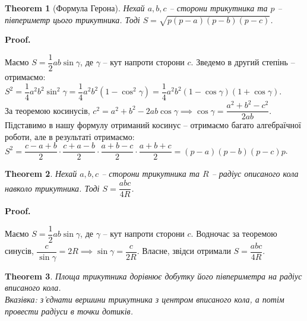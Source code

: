 \documentclass[a4paper, 10pt]{article}
\makeatletter
\theoremstyle{theoremdd}
\newtheorem{theorem}{Theorem}[subsection]
\theoremstyle{theoremdd}
\theoremstyle{theoremdd}
\theoremstyle{theoremdd}
\theoremstyle{theoremdd}
\theoremstyle{theoremdd}
\theoremstyle{theoremdd}
\theoremstyle{theoremdd}
\theoremstyle{theoremdd}
\renewenvironment{proof}[1][Proof.\\]{\par
\pushQED{\hfill \qed}%
\normalfont \topsep6\p@\@plus6\p@\relax
\trivlist
\item\relax
{\bfseries
#1\@addpunct{.}}\hspace\labelsep\ignorespaces
}{%
\popQED\endtrivlist\@endpefalse
}
\makeatother
\begin{document}
\begin{theorem}[Формула Герона]
Нехай $a,b,c$ -- сторони трикутника та $p$ -- півпериметр цього трикутника. Тоді $S = \sqrt{p(p-a)(p-b)(p-c)}$.
\end{theorem}

\begin{proof}
Маємо $S = \dfrac{1}{2}ab \sin \gamma$, де $\gamma$ -- кут напроти сторони $c$. Зведемо в другий степінь -- отримаємо:\\
$S^2 = \dfrac{1}{4}a^2 b^2 \sin^2 \gamma = \dfrac{1}{4} a^2 b^2 (1- \cos^2 \gamma) = \dfrac{1}{4}a^2 b^2 (1-\cos \gamma) (1+ \cos \gamma)$.\\
За теоремою косинусів, $c^2 = a^2+b^2-2ab \cos \gamma \implies \cos \gamma = \dfrac{a^2+b^2-c^2}{2ab}$.\\
Підставимо в нашу формулу отриманий косинус -- отримаємо багато алгебраїчної роботи, але в результаті отримаємо:\\
$S^2 = \dfrac{c-a+b}{2} \cdot \dfrac{c+a-b}{2} \cdot \dfrac{a+b-c}{2} \cdot \dfrac{a+b+c}{2} = (p-a)(p-b)(p-c)p$.
\end{proof}

\begin{theorem}
Нехай $a,b,c$ -- сторони трикутника та $R$ -- радіус описаного кола навколо трикутника. Тоді $S = \dfrac{abc}{4R}$.
\end{theorem}

\begin{proof}
Маємо $S = \dfrac{1}{2}ab \sin \gamma$, де $\gamma$ -- кут напроти сторони $c$. Водночас за теоремою синусів, $\dfrac{c}{\sin \gamma} = 2R \implies \sin \gamma = \dfrac{c}{2R}$. Власне, звідси отримали $S = \dfrac{abc}{4R}$.
\end{proof}

\begin{theorem}
Площа трикутника дорівнює добутку його півпериметра на радіус вписаного кола.\\
\textit{Вказівка: з'єднати вершини трикутника з центром вписаного кола, а потім провести радіуси в точки дотиків.}
\end{theorem}
\end{document}
